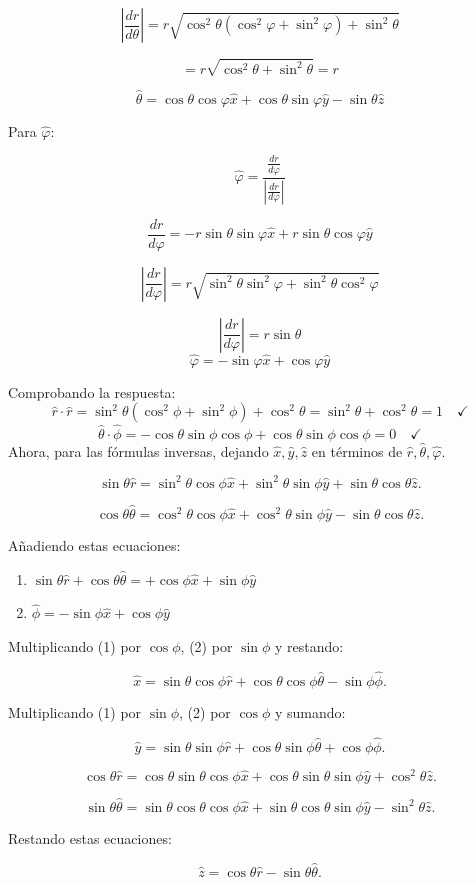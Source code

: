 \documentclass{article}
\begin{document}
\[
\left| \frac{dr}{d\theta} \right| = r \sqrt{\cos^2\theta (\cos^2\varphi + \sin^2\varphi) + \sin^2\theta}
\]

\[
= r \sqrt{\cos^2\theta + \sin^2\theta} = r
\]

\[
\boxed{\hat{\theta} = \cos\theta \cos\varphi \hat{x} + \cos\theta \sin\varphi \hat{y} - \sin\theta \hat{z}}
\]


Para \( \hat{\varphi} \):

\[
\hat{\varphi} = \frac{\frac{dr}{d\varphi}}{\left| \frac{dr}{d\varphi} \right|}
\]

\[
\frac{dr}{d\varphi} = -r \sin\theta \sin\varphi \hat{x} + r \sin\theta \cos\varphi \hat{y}
\]

\[
\left| \frac{dr}{d\varphi} \right| = r \sqrt{\sin^2\theta \sin^2\varphi + \sin^2\theta \cos^2\varphi}
\]

\[
\left| \frac{dr}{d\varphi} \right|= r \sin\theta
\]
\[
\boxed{\hat{\varphi} = -\sin\varphi \hat{x} + \cos\varphi \hat{y}}
\]
\]


Comprobando la respuesta:
\[
\hat{r} \cdot \hat{r} = \sin^2\theta (\cos^2\phi + \sin^2\phi) + \cos^2\theta = \sin^2\theta + \cos^2\theta = 1 \quad \checkmark
\]
\[
\hat{\theta} \cdot \hat{\phi} = -\cos\theta \sin\phi \cos\phi + \cos\theta \sin\phi \cos\phi = 0 \quad \checkmark 
\]
Ahora, para  las fórmulas inversas, dejando \( \hat{x}, \hat{y}, \hat{z} \) en términos de \( \hat{r}, \hat{\theta}, \hat{\varphi} \).


\[
\sin\theta \hat{r} = \sin^2\theta \cos\phi \hat{x} + \sin^2\theta \sin\phi \hat{y} + \sin\theta \cos\theta \hat{z}.
\]

\[
\cos\theta \hat{\theta} = \cos^2\theta \cos\phi \hat{x} + \cos^2\theta \sin\phi \hat{y} - \sin\theta \cos\theta \hat{z}.
\]

Añadiendo estas ecuaciones:

\begin{enumerate}
    \item $\sin\theta \hat{r} + \cos\theta \hat{\theta} = +\cos\phi \hat{x} + \sin\phi \hat{y}$
    \item $\hat{\phi} = -\sin\phi \hat{x} + \cos\phi \hat{y}$
\end{enumerate}

Multiplicando (1) por $\cos\phi$, (2) por $\sin\phi$ y restando:

\[
\boxed{\hat{x} = \sin\theta \cos\phi \hat{r} + \cos\theta \cos\phi \hat{\theta} - \sin\phi \hat{\phi}.}
\]

Multiplicando (1) por $\sin\phi$, (2) por $\cos\phi$ y sumando:

\[
\boxed{\hat{y} = \sin\theta \sin\phi \hat{r} + \cos\theta \sin\phi \hat{\theta} + \cos\phi \hat{\phi}.}
\]

\[
\cos\theta \hat{r} = \cos\theta \sin\theta \cos\phi \hat{x} + \cos\theta \sin\theta \sin\phi \hat{y} + \cos^2\theta \hat{z}.
\]

\[
\sin\theta \hat{\theta} = \sin\theta \cos\theta \cos\phi \hat{x} + \sin\theta \cos\theta \sin\phi \hat{y} - \sin^2\theta \hat{z}.
\]

Restando estas ecuaciones:

\[
\boxed{\hat{z} = \cos\theta \hat{r} - \sin\theta \hat{\theta}.}
\]
\end{document}
